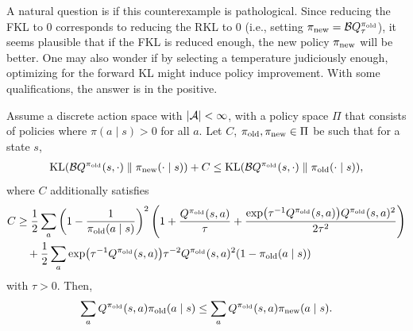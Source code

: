 \documentclass[\main/thesis.tex]{subfiles}
\begin{document}
A natural question is if this counterexample is pathological. Since reducing the FKL to 0 corresponds to reducing the RKL to 0 (i.e., setting ${\pi_\mathrm{new}} = \mathcal{B}Q^{\pi_\mathrm{old}}_\tau$), it seems plausible that if the FKL is reduced enough, the new policy ${\pi_\mathrm{new}}$ will be better. One may also wonder if by selecting a temperature judiciously enough, optimizing for the forward KL might induce policy improvement. With some qualifications, the answer is in the positive. 
%
\begin{proposition}\label{prop:forward-kl-surrogate-2}
Assume a discrete action space with $|\mathcal{A}| < \infty$, with a policy space $\Pi$ that consists of policies where $\pi(a \mid s) > 0$ for all $a$. Let $C$, ${\pi_\mathrm{old}}, {\pi_\mathrm{new}} \in \Pi$ be such that for a state $s$,
\begin{align}\label{eq:forward-improvement}
    \mathrm{KL}(\mathcal{B}Q^{{\pi_\mathrm{old}}}(s, \cdot) \parallel {\pi_\mathrm{new}} (\cdot \mid s)) + C \leq \mathrm{KL}(\mathcal{B}Q^{{\pi_\mathrm{old}}}(s, \cdot) \parallel {\pi_\mathrm{old}}(\cdot \mid s)),
\end{align}
where $C$ additionally satisfies
\begin{align*}
    C &\geq  \frac{1}{2}\sum_a  \left(1 - \frac{1}{{\pi_\mathrm{old}}(a \mid s)}\right)^2 \left(1 + \frac{Q^{\pi_\mathrm{old}}(s, a)}{\tau} + \frac{\exp(\tau^{-1} Q^{\pi_\mathrm{old}}(s, a)) Q^{\pi_\mathrm{old}}(s, a)^2}{2\tau^2}\right) \\
    &\quad + \frac{1}{2} \sum_a \exp(\tau^{-1} Q^{\pi_\mathrm{old}}(s, a)) \tau^{-2} Q^{\pi_\mathrm{old}}(s, a)^2 (1 - {\pi_\mathrm{old}}(a \mid s))
\end{align*}
with $\tau > 0$. Then,
\begin{align*}
    \sum_a Q^{{\pi_\mathrm{old}}}(s, a) {\pi_\mathrm{old}}(a \mid s) \leq \sum_a Q^{{\pi_\mathrm{old}}}(s, a) {\pi_\mathrm{new}}(a \mid s). 
\end{align*}
\end{proposition}
\end{document}
